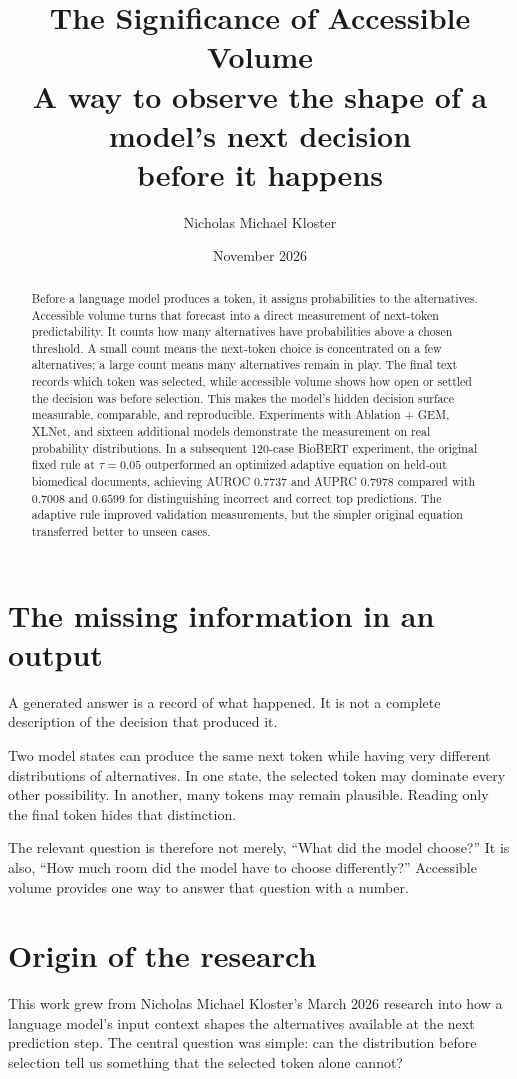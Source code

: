 \documentclass[11pt,a4paper]{article}
\title{\textbf{The Significance of Accessible Volume}\\[5pt]
\large A way to observe the shape of a model's next decision\\before it happens}
\author{Nicholas Michael Kloster}
\date{November 2026}
\begin{document}
\maketitle
\thispagestyle{fancy}

\begin{abstract}
Before a language model produces a token, it assigns probabilities to the alternatives. Accessible volume turns that forecast into a direct measurement of next-token predictability. It counts how many alternatives have probabilities above a chosen threshold. A small count means the next-token choice is concentrated on a few alternatives; a large count means many alternatives remain in play. The final text records which token was selected, while accessible volume shows how open or settled the decision was before selection. This makes the model's hidden decision surface measurable, comparable, and reproducible. Experiments with Ablation + GEM, XLNet, and sixteen additional models demonstrate the measurement on real probability distributions. In a subsequent 120-case BioBERT experiment, the original fixed rule at $\tau=0.05$ outperformed an optimized adaptive equation on held-out biomedical documents, achieving AUROC $0.7737$ and AUPRC $0.7978$ compared with $0.7008$ and $0.6599$ for distinguishing incorrect and correct top predictions. The adaptive rule improved validation measurements, but the simpler original equation transferred better to unseen cases.
\end{abstract}

\section{The missing information in an output}
A generated answer is a record of what happened. It is not a complete description of the decision that produced it.

Two model states can produce the same next token while having very different distributions of alternatives. In one state, the selected token may dominate every other possibility. In another, many tokens may remain plausible. Reading only the final token hides that distinction.

The relevant question is therefore not merely, ``What did the model choose?'' It is also, ``How much room did the model have to choose differently?'' Accessible volume provides one way to answer that question with a number.

\section{Origin of the research}
This work grew from Nicholas Michael Kloster's March 2026 research into how a language model's input context shapes the alternatives available at the next prediction step. The central question was simple: can the distribution before selection tell us something that the selected token alone cannot?
\end{document}
